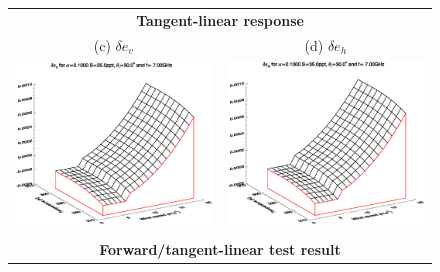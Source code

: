 \begin{figure}[htp]
\begin{tabular}{c c}
    \multicolumn{2}{c}{\sffamily\textbf{Tangent-linear response}}\\
    \textsf{(c)} $\delta e_v$ &
    \textsf{(d)} $\delta e_h$ \\
    \includegraphics[bb=110 240 508 540,clip,scale=0.5]{graphics/Model/FWDTL/Initial/TLdev_a0.1000_s35.0ppt_z30.0_7.00GHz.eps} &
    \includegraphics[bb=110 240 508 540,clip,scale=0.5]{graphics/Model/FWDTL/Initial/TLdeh_a0.1000_s35.0ppt_z30.0_7.00GHz.eps} \\\\
    \multicolumn{2}{c}{\sffamily\textbf{Forward/tangent-linear test result}}\\

\end{tabular}
\end{figure}
